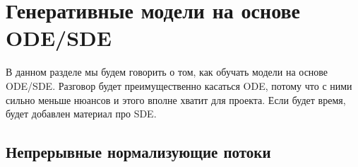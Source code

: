 \documentclass[12pt]{article}
\theoremstyle{definition}
\begin{document}
\section{Генеративные модели на основе ODE/SDE}
В данном разделе мы будем говорить о том, как обучать модели на основе ODE/SDE. Разговор будет преимущественно касаться ODE, потому что с ними сильно меньше нюансов и этого вполне хватит для проекта. Если будет время, будет добавлен материал про SDE. 

\subsection{Непрерывные нормализующие потоки}

\end{document}
